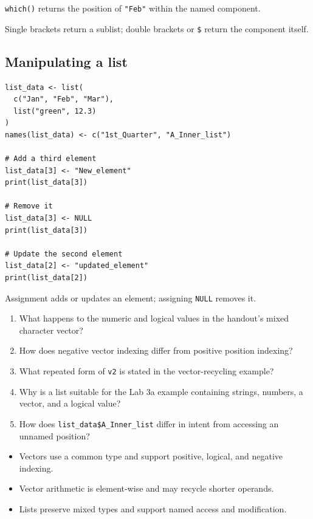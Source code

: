 \texttt{which()} returns the position of \texttt{"Feb"} within the named component.

\begin{keyidea}
Single brackets return a sublist; double brackets or \texttt{\$} return the component itself.
\end{keyidea}

\subsection{Manipulating a list}

\begin{lstlisting}[style=dsr]
list_data <- list(
  c("Jan", "Feb", "Mar"),
  list("green", 12.3)
)
names(list_data) <- c("1st_Quarter", "A_Inner_list")

# Add a third element
list_data[3] <- "New_element"
print(list_data[3])

# Remove it
list_data[3] <- NULL
print(list_data[3])

# Update the second element
list_data[2] <- "updated_element"
print(list_data[2])
\end{lstlisting}

Assignment adds or updates an element; assigning \texttt{NULL} removes it.

\begin{quickcheck}
\begin{enumerate}
  \item What happens to the numeric and logical values in the handout's mixed character vector?
  \item How does negative vector indexing differ from positive position indexing?
  \item What repeated form of \texttt{v2} is stated in the vector-recycling example?
  \item Why is a list suitable for the Lab 3a example containing strings, numbers, a vector, and a logical value?
  \item How does \texttt{list\_data\$A\_Inner\_list} differ in intent from accessing an unnamed position?
\end{enumerate}
\end{quickcheck}

\begin{chapterrecap}
\begin{itemize}
  \item Vectors use a common type and support positive, logical, and negative indexing.
  \item Vector arithmetic is element-wise and may recycle shorter operands.
  \item Lists preserve mixed types and support named access and modification.
\end{itemize}
\end{chapterrecap}
